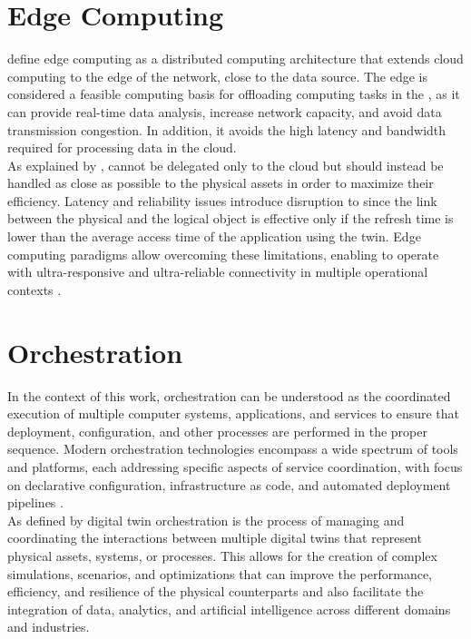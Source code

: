 \section{Edge Computing}
\label{sec:edge_computing}
 define edge computing as a distributed computing architecture that extends cloud computing to the edge of the network,
close to the data source. The edge is considered a feasible computing basis for offloading computing tasks in the \IoT, as it can provide real-time data analysis, increase network capacity, and avoid data transmission congestion. In addition, 
it avoids the high latency and bandwidth required for processing data in the cloud.\\
As explained by \cite{Picone2023}, \DTs cannot be delegated only to the cloud but should instead be handled as close as possible to 
the physical assets in order to maximize their efficiency. Latency and reliability issues introduce disruption to \DTs since the link 
between the physical and the logical object is effective only if the refresh time is lower than the average access time of the 
application using the twin. Edge computing paradigms allow overcoming these limitations, enabling \DTs to operate with ultra-responsive 
and ultra-reliable connectivity in multiple operational contexts \cite{Picone2023}.

\section{Orchestration}
\label{sec:orchestration}
In the context of this work, orchestration can be understood as the coordinated execution of multiple computer systems,
applications, and services to ensure that deployment, configuration, and other processes are performed in the proper sequence.
Modern orchestration technologies encompass a wide spectrum of tools and platforms, each addressing specific aspects of service
coordination, with focus on declarative configuration, infrastructure as code, and automated deployment pipelines \cite{Singhal2024}.\\
As defined by  digital twin orchestration is the process of managing and coordinating the interactions
between multiple digital twins that represent physical assets, systems, or processes. This allows for the creation of complex
simulations, scenarios, and optimizations that can improve the performance, efficiency, and resilience of the physical counterparts
and also facilitate the integration of data, analytics, and artificial intelligence across different domains and industries.

